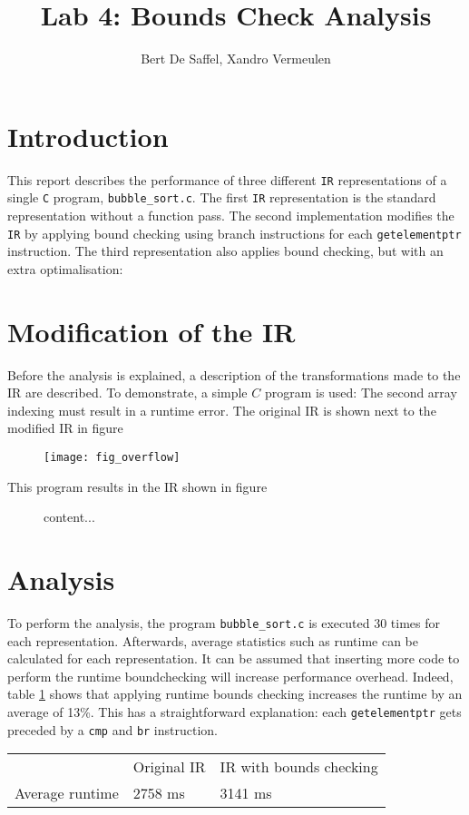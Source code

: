 \documentclass{article}
\title{Lab 4: Bounds Check Analysis}
\author{Bert De Saffel, Xandro Vermeulen}
\begin{document}
	\maketitle
	\tableofcontents
	\section{Introduction}
	This report describes the performance of three different \texttt{IR} representations of a single \texttt{C} program, \texttt{bubble\_sort.c}. The first \texttt{IR} representation is the standard representation without a function pass. The second implementation modifies the \texttt{IR} by applying bound checking using branch instructions for each \texttt{getelementptr} instruction. The third representation also applies bound checking, but with an extra optimalisation: 
	
	\section{Modification of the IR}
	Before the analysis is explained, a description of the transformations made to the IR are described. To demonstrate, a simple $C$ program is used:
The second array indexing must result in a runtime error. The original IR is shown next to the modified IR in figure 

\begin{figure}
	\begin{minipage}{0.5\textwidth}
		\texttt{[image: fig\_overflow]}
	\end{minipage}
\end{figure}

This program results in the IR shown in figure 
\begin{figure}
	content...
\end{figure}
	\section{Analysis}
	To perform the analysis, the program \texttt{bubble\_sort.c} is executed 30 times for each representation. Afterwards, average statistics such as runtime can be calculated for each representation. It can be assumed that inserting more code to perform the runtime boundchecking will increase performance overhead. Indeed, table \ref{table:1} shows that applying runtime bounds checking increases the runtime by an average of 13\%. This has a straightforward explanation: each \texttt{getelementptr} gets preceded by a \texttt{cmp} and \texttt{br} instruction.
	
	\begin{table}
		\centering
		\begin{tabular}{ l | l | l |}
			& Original IR & IR with bounds checking \\
			Average runtime & 2758 ms & 3141 ms
		\end{tabular}
		\label{table:1}
	\end{table}
	
	
	
	
\end{document}
